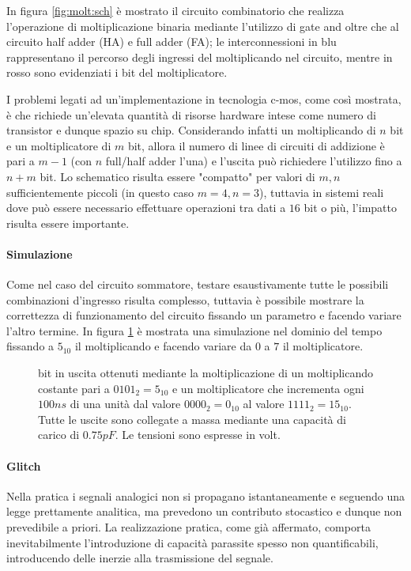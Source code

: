 	In figura \ref{fig:molt:sch} è mostrato il circuito combinatorio che realizza l'operazione di moltiplicazione binaria mediante l'utilizzo di gate and oltre che al circuito half adder (HA) e full adder (FA); le interconnessioni in blu rappresentano il percorso degli ingressi del moltiplicando nel circuito, mentre in rosso sono evidenziati i bit del moltiplicatore.
	
	I problemi legati ad un'implementazione in tecnologia c-mos, come così mostrata, è che richiede un'elevata quantità di risorse hardware intese come numero di transistor e dunque spazio su chip. Considerando infatti un moltiplicando di $n$ bit e un moltiplicatore di $m$ bit, allora il numero di linee di circuiti di addizione è pari a $m-1$ (con $n$ full/half adder l'una) e l'uscita può richiedere l'utilizzo fino a $n+m$ bit. Lo schematico risulta essere "compatto" per valori di $m,n$ sufficientemente piccoli (in questo caso $m=4,n=3$), tuttavia in sistemi reali dove può essere necessario effettuare operazioni tra dati a $16$ bit o più, l'impatto risulta essere importante.
	
	\paragraph{Simulazione} Come nel caso del circuito sommatore, testare esaustivamente tutte le possibili combinazioni d'ingresso risulta complesso, tuttavia è possibile mostrare la correttezza di funzionamento del circuito fissando un parametro e facendo variare l'altro termine. In figura \ref{fig:molt:sim} è mostrata una simulazione nel dominio del tempo fissando a $5_{10}$ il moltiplicando e facendo variare da $0$ a $7$ il moltiplicatore.
	
	\begin{figure}[p]
		\centering
		
		\caption{bit in uscita ottenuti mediante la moltiplicazione di un moltiplicando costante pari a $0101_2=5_{10}$ e un moltiplicatore che incrementa ogni $100ns$ di una unità dal valore $0000_2=0_{10}$ al valore $1111_2=15_{10}$. Tutte le uscite sono collegate a massa mediante una capacità di carico di $0.75pF$. Le tensioni sono espresse in volt. }
		\label{fig:molt:sim}
	\end{figure}
	
	\paragraph{Glitch} Nella pratica i segnali analogici non si propagano istantaneamente e seguendo una legge prettamente analitica, ma prevedono un contributo stocastico e dunque non prevedibile a priori. La realizzazione pratica, come già affermato, comporta inevitabilmente l'introduzione di capacità parassite spesso non quantificabili, introducendo delle inerzie alla trasmissione del segnale.
	
